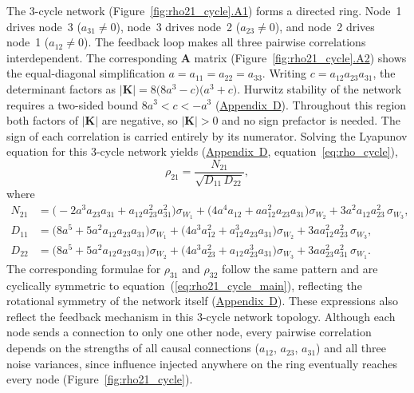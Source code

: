\documentclass[12pt]{article}
\begin{document}
The 3-cycle network
(Figure~\ref{fig:rho21_cycle}\hyperref[fig:cycle_A1]{.A1})
forms a directed ring. Node~1 drives node~3
($a_{31}\neq0$), node~3 drives node~2 ($a_{23}\neq0$),
and node~2 drives node~1 ($a_{12}\neq0$).
The feedback loop makes all three pairwise correlations
interdependent. The corresponding
$\mathbf{A}$ matrix
(Figure~\ref{fig:rho21_cycle}\hyperref[fig:cycle_A2]{.A2})
shows the equal-diagonal simplification $a=a_{11}=a_{22}=a_{33}$.
Writing $c=a_{12}a_{23}a_{31}$, the determinant factors as
$|\mathbf{K}|=8\bigl(8a^3-c\bigr)\bigl(a^3+c\bigr)$.
Hurwitz stability of the network requires a two-sided bound
$8a^3<c<-a^3$ (\hyperref[app:appD]{Appendix~D}).
Throughout this region both factors of $|\mathbf{K}|$ are
negative, so $|\mathbf{K}|>0$ and no sign prefactor is needed. The sign of each correlation is carried entirely by its
numerator. Solving the Lyapunov equation for this 3-cycle network yields
(\hyperref[app:appD]{Appendix~D},
equation~\ref{eq:rho_cycle}),
\begin{equation}
\rho_{21} = \frac{N_{21}}{\sqrt{D_{11}\,D_{22}}},
\label{eq:rho21_cycle_main}
\end{equation}
where
\begin{align}
N_{21} &= \bigl(-2a^3a_{23}a_{31}+a_{12}a_{23}^2a_{31}^2\bigr)\sigma_{W_1}
        + \bigl(4a^4a_{12}+aa_{12}^2a_{23}a_{31}\bigr)\sigma_{W_2}
        + 3a^2a_{12}a_{23}^2\,\sigma_{W_3},
\label{eq:N21_cycle_main}\\[4pt]
D_{11} &= \bigl(8a^5+5a^2a_{12}a_{23}a_{31}\bigr)\sigma_{W_1}
        + \bigl(4a^3a_{12}^2+a_{12}^3a_{23}a_{31}\bigr)\sigma_{W_2}
        + 3aa_{12}^2a_{23}^2\,\sigma_{W_3},
\label{eq:D11_cycle_main}\\[4pt]
D_{22} &= \bigl(8a^5+5a^2a_{12}a_{23}a_{31}\bigr)\sigma_{W_2}
        + \bigl(4a^3a_{23}^2+a_{12}a_{23}^3a_{31}\bigr)\sigma_{W_3}
        + 3aa_{23}^2a_{31}^2\,\sigma_{W_1}.
\label{eq:D22_cycle_main}
\end{align}
The corresponding formulae for $\rho_{31}$ and $\rho_{32}$
follow the same pattern and are cyclically symmetric to
equation~(\ref{eq:rho21_cycle_main}), reflecting the rotational
symmetry of the network itself
(\hyperref[app:appD]{Appendix~D}). These expressions also reflect the feedback mechanism in this 3-cycle network topology. Although
each node sends a connection to only one other node, every
pairwise correlation depends on the strengths of all causal connections
($a_{12}$, $a_{23}$, $a_{31}$) and all three noise variances,
since influence injected anywhere on the ring eventually
reaches every node (Figure~\ref{fig:rho21_cycle}).
\end{document}
